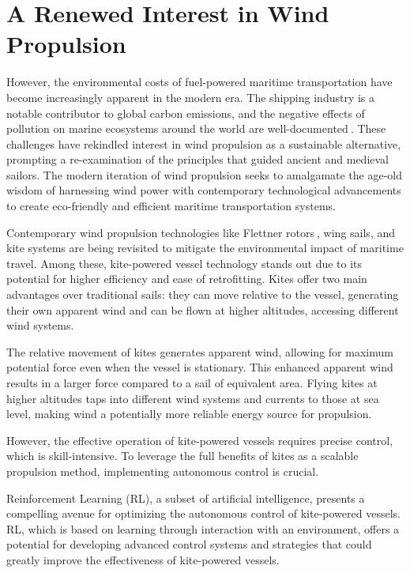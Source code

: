 \section{A Renewed Interest in Wind Propulsion}
However, the environmental costs of fuel-powered maritime transportation have become increasingly apparent in the modern era. The shipping industry is a notable contributor to global carbon emissions, and the negative effects of pollution on marine ecosystems around the world are well-documented$~$\cite{corbett2007mortality}. These challenges have rekindled interest in wind propulsion as a sustainable alternative, prompting a re-examination of the principles that guided ancient and medieval sailors. The modern iteration of wind propulsion seeks to amalgamate the age-old wisdom of harnessing wind power with contemporary technological advancements to create eco-friendly and efficient maritime transportation systems.

Contemporary wind propulsion technologies like Flettner rotors$~$\cite{vahs2019retrofitting}, wing sails, and kite systems are being revisited to mitigate the environmental impact of maritime travel. Among these, kite-powered vessel technology stands out due to its potential for higher efficiency and ease of retrofitting. Kites offer two main advantages over traditional sails: they can move relative to the vessel, generating their own apparent wind and can be flown at higher altitudes, accessing different wind systems.

The relative movement of kites generates apparent wind, allowing for maximum potential force even when the vessel is stationary. This enhanced apparent wind results in a larger force compared to a sail of equivalent area. Flying kites at higher altitudes taps into different wind systems and currents to those at sea level, making wind a potentially more reliable energy source for propulsion.

However, the effective operation of kite-powered vessels requires precise control, which is skill-intensive. To leverage the full benefits of kites as a scalable propulsion method, implementing autonomous control is crucial. 

Reinforcement Learning (RL), a subset of artificial intelligence, presents a compelling avenue for optimizing the autonomous control of kite-powered vessels. RL, which is based on learning through interaction with an environment, offers a potential for developing advanced control systems and strategies that could greatly improve the effectiveness of kite-powered vessels. 



